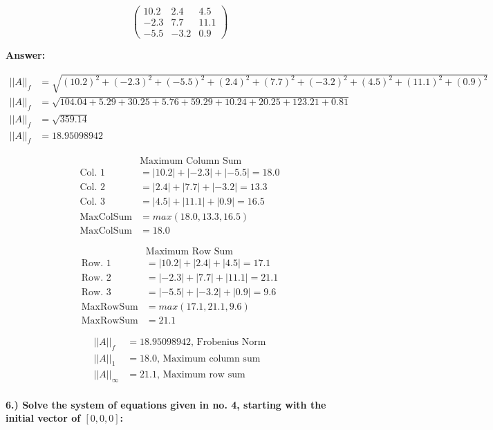 \documentclass[
]{article}
\begin{document}
\[
\left(
\begin{array}{ccc}
10.2 & 2.4 & 4.5 \\
-2.3 & 7.7 & 11.1 \\
-5.5 & -3.2 & 0.9
\end{array}
\right)
\]

\textbf{Answer:}

\[
\begin{aligned}
||A||_f &= \sqrt{(10.2)^2 + (-2.3)^2 + (-5.5)^2 + (2.4)^2 + (7.7)^2 + (-3.2)^2 + (4.5)^2 + (11.1)^2 + (0.9)^2} \\
||A||_f &= \sqrt{104.04 + 5.29 + 30.25 + 5.76 + 59.29 + 10.24 + 20.25 + 123.21 + 0.81} \\
||A||_f &= \sqrt{359.14} \\
||A||_f &= 18.95098942
\end{aligned}
\]

\[
\begin{aligned}
&\text{Maximum Column Sum} \\
\text{Col. 1} &= |10.2| + |-2.3| + |-5.5| = 18.0 \\
\text{Col. 2} &= |2.4| + |7.7| + |-3.2| = 13.3 \\
\text{Col. 3} &= |4.5| + |11.1| + |0.9| = 16.5 \\
\text{MaxColSum} &= max(18.0, 13.3, 16.5) \\
\text{MaxColSum} &= 18.0
\end{aligned}
\]

\[
\begin{aligned}
&\text{Maximum Row Sum} \\
\text{Row. 1} &= |10.2| + |2.4| + |4.5| = 17.1 \\
\text{Row. 2} &= |-2.3| + |7.7| + |11.1| = 21.1 \\
\text{Row. 3} &= |-5.5| + |-3.2| + |0.9| = 9.6 \\
\text{MaxRowSum} &= max(17.1, 21.1, 9.6) \\
\text{MaxRowSum} &= 21.1
\end{aligned}
\]

\[
\begin{aligned}
||A||_f &= 18.95098942 \text{, Frobenius Norm} \\
||A||_1 &= 18.0 \text{, Maximum column sum} \\
||A||_\infty &= 21.1 \text{, Maximum row sum}
\end{aligned}
\]

\paragraph{\texorpdfstring{6.) Solve the system of equations given in
no. 4, starting with the initial vector of
\([0,0,0]\):}{6.) Solve the system of equations given in no. 4, starting with the initial vector of {[}0,0,0{]}:}}\label{solve-the-system-of-equations-given-in-no.-4-starting-with-the-initial-vector-of-000}
\end{document}
